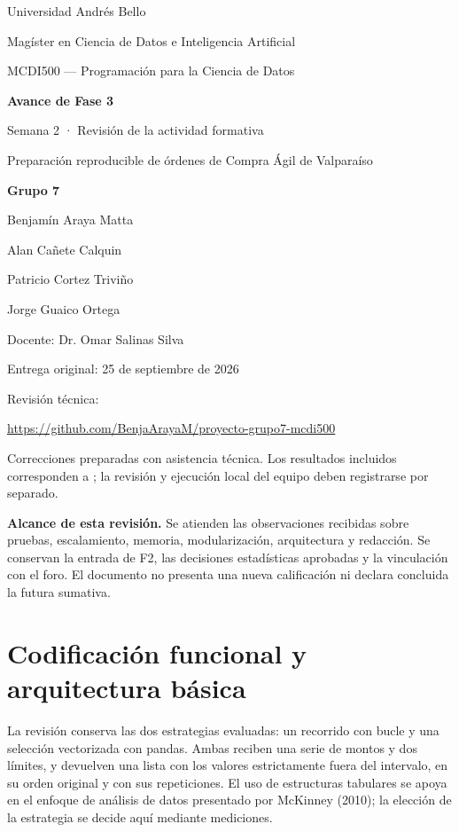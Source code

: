 \documentclass[11pt,letterpaper]{article}
\begin{document}
\begin{titlepage}
\thispagestyle{empty}
\begin{center}
\vspace*{1cm}
{\large Universidad Andrés Bello}\par
Magíster en Ciencia de Datos e Inteligencia Artificial\par
MCDI500 — Programación para la Ciencia de Datos\par
\vspace{1.2cm}
{\Large\bfseries Avance de Fase 3}\par
{\large Semana 2 · Revisión de la actividad formativa}\par
\vspace{0.8cm}
{\Large Preparación reproducible de órdenes de Compra Ágil de Valparaíso}\par
\vspace{1cm}
\textbf{Grupo 7}\par
Benjamín Araya Matta\par
Alan Cañete Calquin\par
Patricio Cortez Triviño\par
Jorge Guaico Ortega\par
\vspace{0.6cm}
Docente: Dr. Omar Salinas Silva\par
Entrega original: 25 de septiembre de 2026\par
Revisión técnica: \FechaUTC\par
\vfill
\url{https://github.com/BenjaArayaM/proyecto-grupo7-mcdi500}\par
\vspace{0.4cm}
{\small Correcciones preparadas con asistencia técnica. Los resultados incluidos corresponden a
\Contexto; la revisión y ejecución local del equipo deben registrarse por separado.}
\end{center}
\end{titlepage}
\setcounter{page}{2}
\tableofcontents
\vspace{0.7cm}
\textbf{Alcance de esta revisión.} Se atienden las observaciones recibidas sobre pruebas,
escalamiento, memoria, modularización, arquitectura y redacción. Se conservan la entrada de F2,
las decisiones estadísticas aprobadas y la vinculación con el foro. El documento no presenta
una nueva calificación ni declara concluida la futura sumativa.
\clearpage

\section{Codificación funcional y arquitectura básica}
La revisión conserva las dos estrategias evaluadas: un recorrido con bucle y una selección
vectorizada con pandas. Ambas reciben una serie de montos y dos límites, y devuelven una lista
con los valores estrictamente fuera del intervalo, en su orden original y con sus repeticiones.
El uso de estructuras tabulares se apoya en el enfoque de análisis de datos presentado por
McKinney (2010); la elección de la estrategia se decide aquí mediante mediciones.
\end{document}

